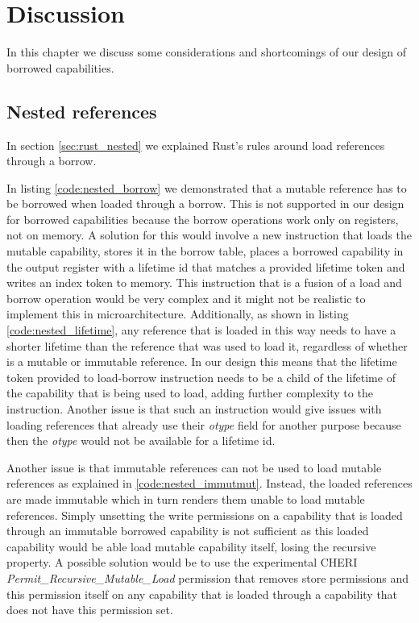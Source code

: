 \chapter{Discussion}
\label{chap:discussion}
In this chapter we discuss some considerations and shortcomings of our design of borrowed capabilities.

\section{Nested references}
In section \ref{sec:rust_nested} we explained Rust's rules around load references through a borrow.

In listing \ref{code:nested_borrow} we demonstrated that a mutable reference has to be borrowed when loaded through a borrow.
This is not supported in our design for borrowed capabilities because the borrow operations work only on registers, not on memory.
A solution for this would involve a new instruction that loads the mutable capability, stores it in the borrow table, places a borrowed capability in the output register with a lifetime id that matches a provided lifetime token and writes an index token to memory.
This instruction that is a fusion of a load and borrow operation would be very complex and it might not be realistic to implement this in microarchitecture.
Additionally, as shown in listing \ref{code:nested_lifetime}, any reference that is loaded in this way needs to have a shorter lifetime than the reference that was used to load it, regardless of whether is a mutable or immutable reference.
In our design this means that the lifetime token provided to load-borrow instruction needs to be a child of the lifetime of the capability that is being used to load, adding further complexity to the instruction.
Another issue is that such an instruction would give issues with loading references that already use their \textit{otype} field for another purpose because then the \textit{otype} would not be available for a lifetime id.

Another issue is that immutable references can not be used to load mutable references as explained in \ref{code:nested_immutmut}.
Instead, the loaded references are made immutable which in turn renders them unable to load mutable references.
Simply unsetting the write permissions on a capability that is loaded through an immutable borrowed capability is not sufficient as this loaded capability would be able load mutable capability itself, losing the recursive property.
A possible solution would be to use the experimental CHERI \textit{Permit\_Recursive\_Mutable\_Load} permission that removes store permissions and this permission itself on any capability that is loaded through a capability that does not have this permission set.

